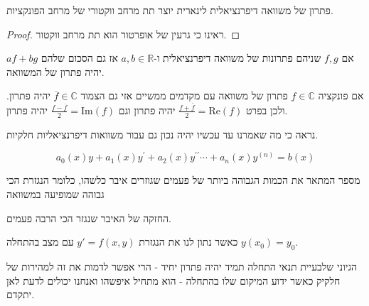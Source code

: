 \documentclass{tstextbook}
\begin{document}
\begin{proposition}
פתרון של משוואה דיפרנציאלית לינארית יוצר תת מרחב ווקטורי של מרחב הפונקציות.

\end{proposition}
\begin{proof}
ראינו כי גרעין של אופרטור הוא תת מרחב ווקטור.

\end{proof}
\begin{corollary}
אם \(f,g\) שניהם פתרונות של משוואה דיפרנציאלית ו-\(a,b \in \mathbb{R}\) אז גם הסכום שלהם \(af+bg\) יהיה פתרון של המשוואה.

\end{corollary}
\begin{proposition}
אם פונקציה \(f \in \mathbb{C}\) פתרון של משוואה עם מקדמים ממשיים אזי גם הצמוד \(\overline{f}\in \mathbb{C}\) יהיה פתרון. ולכן בפרט \(\frac{f+\overline{f}}{2}=\mathrm{Re}(f)\) יהיה פתרון וגם \(\frac{f-\overline{f}}{2}=\mathrm{Im}(f)\) יהיה פתרון.

\end{proposition}
\begin{remark}
נראה כי מה שאמרנו עד עכשיו יהיה נכון גם עבור משוואות דיפרנציאליות חלקיות.

\end{remark}
\begin{proposition}
$$a_{0}(x)y+a_{1}(x)y^{\prime}+a_{2}(x)y^{\prime\prime}\cdots+a_{n}(x)y^{(n)}=b(x)$$

\end{proposition}
\begin{definition}
מספר המתאר את הכמות הגבוהה ביותר של פעמים שגוזרים איבר כלשהו, כלומר הנגזרת הכי גבוהה שמופיעה במשוואה

\end{definition}
\begin{definition}
החזקה של האיבר שנגזר הכי הרבה פעמים.

\end{definition}
\begin{definition}
כאשר נתון לנו את הנגזרת \(y'=f(x,y)\) עם מצב בהתחלה \(y(x_{0})=y_{0}\).

\end{definition}
הגיוני שלבעיית תנאי התחלה תמיד יהיה פתרון יחיד - הרי אפשר לדמות את זה למהירות של חלקיק כאשר ידוע המיקום שלו בהתחלה - הוא מתחיל איפשהו ואנחנו יכולים לדעת לאן יתקדם.
\end{document}
